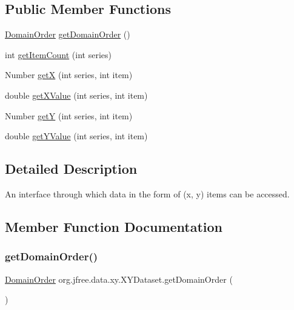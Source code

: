 \subsection*{Public Member Functions}
\begin{DoxyCompactItemize}
\item 
\mbox{\hyperlink{classorg_1_1jfree_1_1data_1_1_domain_order}{Domain\+Order}} \mbox{\hyperlink{interfaceorg_1_1jfree_1_1data_1_1xy_1_1_x_y_dataset_a49306db52a1ea7de951d807d21ab9c7c}{get\+Domain\+Order}} ()
\item 
int \mbox{\hyperlink{interfaceorg_1_1jfree_1_1data_1_1xy_1_1_x_y_dataset_ae81f9de91dfcae45028fc8a486a119da}{get\+Item\+Count}} (int series)
\item 
Number \mbox{\hyperlink{interfaceorg_1_1jfree_1_1data_1_1xy_1_1_x_y_dataset_a85c75ba5b69b551e96afd29d1732ba22}{getX}} (int series, int item)
\item 
double \mbox{\hyperlink{interfaceorg_1_1jfree_1_1data_1_1xy_1_1_x_y_dataset_a65bd212539d8f7dfb3d3d36b5f42e083}{get\+X\+Value}} (int series, int item)
\item 
Number \mbox{\hyperlink{interfaceorg_1_1jfree_1_1data_1_1xy_1_1_x_y_dataset_aa915867221e0f94021bad3140db5254e}{getY}} (int series, int item)
\item 
double \mbox{\hyperlink{interfaceorg_1_1jfree_1_1data_1_1xy_1_1_x_y_dataset_a5e86389417eb5ed7b663a952ca370914}{get\+Y\+Value}} (int series, int item)
\end{DoxyCompactItemize}


\subsection{Detailed Description}
An interface through which data in the form of (x, y) items can be accessed. 

\subsection{Member Function Documentation}
\mbox{\label{interfaceorg_1_1jfree_1_1data_1_1xy_1_1_x_y_dataset_a49306db52a1ea7de951d807d21ab9c7c}} 
\subsubsection{\texorpdfstring{get\+Domain\+Order()}{getDomainOrder()}}
{\footnotesize\ttfamily \mbox{\hyperlink{classorg_1_1jfree_1_1data_1_1_domain_order}{Domain\+Order}} org.\+jfree.\+data.\+xy.\+X\+Y\+Dataset.\+get\+Domain\+Order (\begin{DoxyParamCaption}{ }\end{DoxyParamCaption})}

